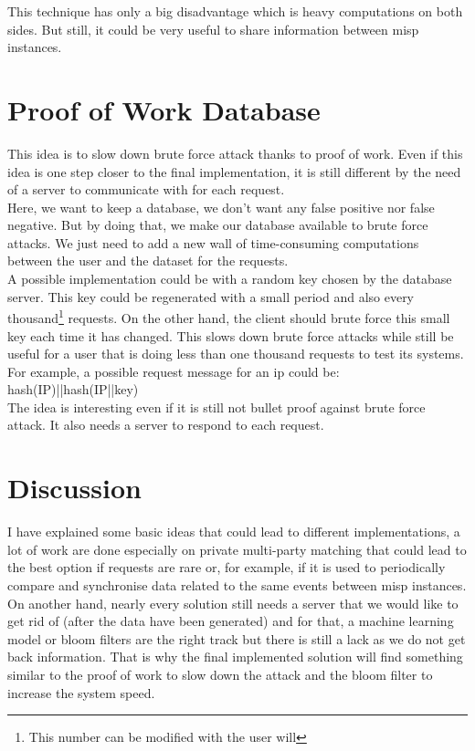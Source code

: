 \documentclass{eplmastersthesis}
\begin{document}
This technique has only a big disadvantage which is heavy computations on both sides. But still, it could be very useful to share information between \gls{misp} instances.

\section{Proof of Work Database}
This idea is to slow down brute force attack thanks to proof of work. Even if this idea is one step closer to the final implementation, it is still different by the need of a server to communicate with for each request.\\

Here, we want to keep a database, we don't want any false positive nor false negative. But by doing that, we make our database available to brute force attacks.
We just need to add a new wall of time-consuming computations between the user and the dataset for the requests.\\

A possible implementation could be with a random key chosen by the database server. This key could be regenerated with a small period and also every thousand\footnote{This number can be modified with the user will} requests.
On the other hand, the client should brute force this small key each time it has changed. This slows down brute force attacks while still be useful for a user that is doing less than one thousand requests to test its systems.
For example, a possible request message for an \gls{ip} could be: hash(IP)||hash(IP||key)\\

The idea is interesting even if it is still not bullet proof against brute force attack. It also needs a server to respond to each request.

\section{Discussion}
I have explained some basic ideas that could lead to different implementations, a lot of work are done especially on private multi-party matching that could lead to the best option if requests are rare or, for example, if it is used to periodically compare and synchronise data related to the same events between \gls{misp} instances.
On another hand, nearly every solution still needs a server that we would like to get rid of (after the data have been generated) and for that, a machine learning model or bloom filters are the right track but there is still a lack as we do not get back information. That is why the final implemented solution will find something similar to the proof of work to slow down the attack and the bloom filter to increase the system speed.\\
\end{document}
